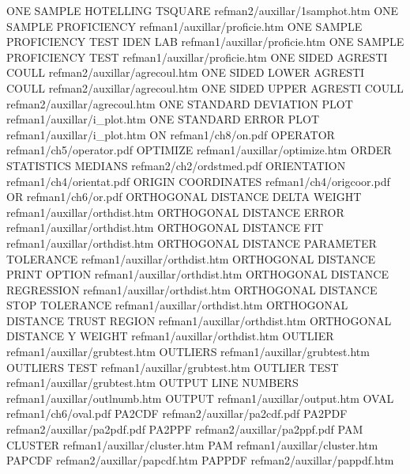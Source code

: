 ONE SAMPLE HOTELLING TSQUARE            refman2/auxillar/1samphot.htm
ONE SAMPLE PROFICIENCY                  refman1/auxillar/proficie.htm
ONE SAMPLE PROFICIENCY TEST IDEN LAB    refman1/auxillar/proficie.htm
ONE SAMPLE PROFICIENCY TEST             refman1/auxillar/proficie.htm
ONE SIDED AGRESTI COULL                 refman2/auxillar/agrecoul.htm
ONE SIDED LOWER AGRESTI COULL           refman2/auxillar/agrecoul.htm
ONE SIDED UPPER AGRESTI COULL           refman2/auxillar/agrecoul.htm
ONE STANDARD DEVIATION PLOT             refman1/auxillar/i_plot.htm
ONE STANDARD ERROR PLOT                 refman1/auxillar/i_plot.htm
ON                                      refman1/ch8/on.pdf
OPERATOR                                refman1/ch5/operator.pdf
OPTIMIZE                                refman1/auxillar/optimize.htm
ORDER STATISTICS MEDIANS                refman2/ch2/ordstmed.pdf
ORIENTATION                             refman1/ch4/orientat.pdf
ORIGIN COORDINATES                      refman1/ch4/origcoor.pdf
OR                                      refman1/ch6/or.pdf
ORTHOGONAL DISTANCE DELTA WEIGHT        refman1/auxillar/orthdist.htm
ORTHOGONAL DISTANCE ERROR               refman1/auxillar/orthdist.htm
ORTHOGONAL DISTANCE FIT                 refman1/auxillar/orthdist.htm
ORTHOGONAL DISTANCE PARAMETER TOLERANCE refman1/auxillar/orthdist.htm
ORTHOGONAL DISTANCE PRINT OPTION        refman1/auxillar/orthdist.htm
ORTHOGONAL DISTANCE REGRESSION          refman1/auxillar/orthdist.htm
ORTHOGONAL DISTANCE STOP TOLERANCE      refman1/auxillar/orthdist.htm
ORTHOGONAL DISTANCE TRUST REGION        refman1/auxillar/orthdist.htm
ORTHOGONAL DISTANCE Y WEIGHT            refman1/auxillar/orthdist.htm
OUTLIER                                 refman1/auxillar/grubtest.htm
OUTLIERS                                refman1/auxillar/grubtest.htm
OUTLIERS TEST                           refman1/auxillar/grubtest.htm
OUTLIER TEST                            refman1/auxillar/grubtest.htm
OUTPUT LINE NUMBERS                     refman1/auxillar/outlnumb.htm
OUTPUT                                  refman1/auxillar/output.htm
OVAL                                    refman1/ch6/oval.pdf
PA2CDF                                  refman2/auxillar/pa2cdf.pdf
PA2PDF                                  refman2/auxillar/pa2pdf.pdf
PA2PPF                                  refman2/auxillar/pa2ppf.pdf
PAM CLUSTER                             refman1/auxillar/cluster.htm
PAM                                     refman1/auxillar/cluster.htm
PAPCDF                                  refman2/auxillar/papcdf.htm
PAPPDF                                  refman2/auxillar/pappdf.htm
